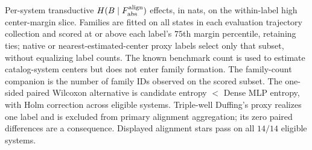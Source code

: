 \begin{table}[tbp]
\centering
\caption{Per-system transductive \(H(B\mid F_{\rm abs}^{\rm align})\) effects, in nats, on the within-label high center-margin slice. Families are fitted on all states in each evaluation trajectory collection and scored at or above each label's \(75\)th margin percentile, retaining ties; native or nearest-estimated-center proxy labels select only that subset, without equalizing label counts. The known benchmark count is used to estimate catalog-system centers but does not enter family formation. The family-count companion is the number of family IDs observed on the scored subset. The one-sided paired Wilcoxon alternative is candidate entropy \(<\) Dense MLP entropy, with Holm correction across eligible systems. Triple-well Duffing's proxy realizes one label and is excluded from primary alignment aggregation; its zero paired differences are a consequence. Displayed alignment stars pass on all \(14/14\) eligible systems.}
\label{tab:persystem_hbf}
\setlength{\tabcolsep}{3pt}
\resizebox{\textwidth}{!}{}
\end{table}
